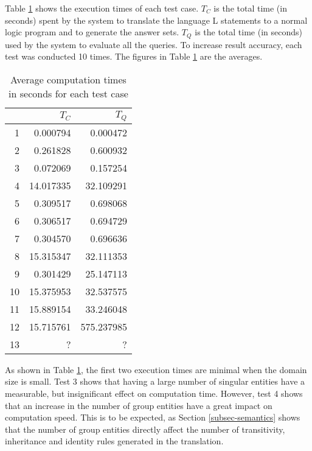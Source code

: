 \documentclass[glov2,twocolumn,final]{svjour2}
\begin{document}
      Table \ref{tab-2} shows the execution times of each test case. $T_{C}$ is
      the total time (in seconds) spent by the system to translate the language
      {\cal L} statements to a normal logic program and to generate the answer
      sets. $T_{Q}$ is the total time (in seconds) used by the system to
      evaluate all the queries. To increase result accuracy, each test was
      conducted 10 times. The figures in Table \ref{tab-2} are the averages.

      \begin{table}[ht]
        \begin{center}
          \begin{tabular}[t]{|r|r|r|}
            \hline
            &
            \textbf{$T_{C}$} &
            \textbf{$T_{Q}$} \\
            \hline
            1 & 0.000794 & 0.000472 \\
            \hline
            2 & 0.261828  & 0.600932 \\
            \hline
            3 & 0.072069 & 0.157254 \\
            \hline
            4 & 14.017335 & 32.109291 \\
            \hline
            5 & 0.309517 & 0.698068 \\
            \hline
            6 & 0.306517 & 0.694729 \\
            \hline
            7 & 0.304570 & 0.696636 \\
            \hline
            8 & 15.315347 & 32.111353 \\
            \hline
            9 & 0.301429 & 25.147113 \\
            \hline
            10 & 15.375953 & 32.537575 \\
            \hline
            11 & 15.889154 & 33.246048 \\
            \hline
            12 & 15.715761 & 575.237985 \\
            \hline
            13 & ? & ? \\
            \hline
          \end{tabular}
        \end{center}
        \caption[]{Average computation times in seconds for each test case}
        \label{tab-2}
      \end{table}

      As shown in Table \ref{tab-2}, the first two execution times are minimal
      when the domain size is small. Test 3 shows that having a large number of
      singular entities have a measurable, but insignificant effect on
      computation time. However, test 4 shows that an increase in the number of
      group entities have a great impact on computation speed. This is to be
      expected, as Section \ref{subsec-semantics} shows that the number of group
      entities directly affect the number of transitivity, inheritance and
      identity rules generated in the translation.
\end{document}
